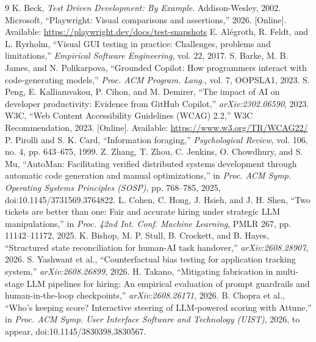 \documentclass[9pt,twocolumn]{extarticle}
\begin{document}
\begin{thebibliography}{9}
\fontsize{6.5}{7.2}\selectfont
\setlength{\itemsep}{0pt}
\setlength{\parsep}{0pt}
 K. Beck, \emph{Test Driven Development: By Example}. Addison-Wesley, 2002.
 Microsoft, ``Playwright: Visual comparisons and assertions,'' 2026. [Online]. Available: \url{https://playwright.dev/docs/test-snapshots}
 E. Al\'egroth, R. Feldt, and L. Ryrholm, ``Visual GUI testing in practice: Challenges, problems and limitations,'' \emph{Empirical Software Engineering}, vol. 22, 2017.
 S. Barke, M. B. James, and N. Polikarpova, ``Grounded Copilot: How programmers interact with code-generating models,'' \emph{Proc. ACM Program. Lang.}, vol. 7, OOPSLA1, 2023.
 S. Peng, E. Kalliamvakou, P. Cihon, and M. Demirer, ``The impact of AI on developer productivity: Evidence from GitHub Copilot,'' \emph{arXiv:2302.06590}, 2023.
 W3C, ``Web Content Accessibility Guidelines (WCAG) 2.2,'' W3C Recommendation, 2023. [Online]. Available: \url{https://www.w3.org/TR/WCAG22/}
 P. Pirolli and S. K. Card, ``Information foraging,'' \emph{Psychological Review}, vol. 106, no. 4, pp. 643--675, 1999.
 Z. Zhang, T. Zhou, C. Jenkins, O. Chowdhury, and S. Mu, ``AutoMan: Facilitating verified distributed systems development through automatic code generation and manual optimizations,'' in \emph{Proc. ACM Symp. Operating Systems Principles (SOSP)}, pp. 768--785, 2025, doi:10.1145/3731569.3764822.
 L. Cohen, C. Hong, J. Hsieh, and J. H. Shen, ``Two tickets are better than one: Fair and accurate hiring under strategic LLM manipulations,'' in \emph{Proc. 42nd Int. Conf. Machine Learning}, PMLR 267, pp. 11142--11172, 2025.
 K. Bishop, M. P. Stull, B. Crockett, and B. Hayes, ``Structured state reconciliation for human-AI task handover,'' \emph{arXiv:2608.28907}, 2026.
 S. Yashwant et al., ``Counterfactual bias testing for application tracking system,'' \emph{arXiv:2608.26899}, 2026.
 H. Takano, ``Mitigating fabrication in multi-stage LLM pipelines for hiring: An empirical evaluation of prompt guardrails and human-in-the-loop checkpoints,'' \emph{arXiv:2608.26171}, 2026.
 B. Chopra et al., ``Who's keeping score? Interactive steering of LLM-powered scoring with Attune,'' in \emph{Proc. ACM Symp. User Interface Software and Technology (UIST)}, 2026, to appear, doi:10.1145/3830398.3830567.
\end{thebibliography}
\end{document}
